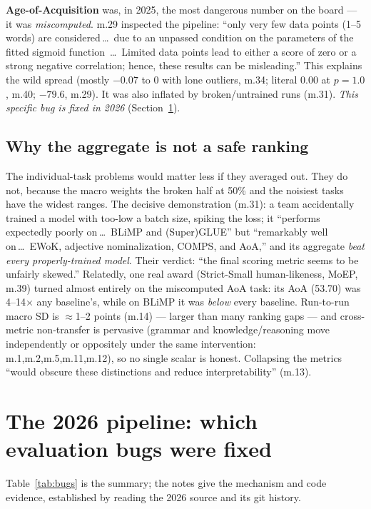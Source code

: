 \documentclass[11pt]{article}
\begin{document}
\textbf{Age-of-Acquisition} was, in 2025, the most dangerous number on the board --- it was
\emph{miscomputed}. m.29 inspected the pipeline: ``only very few data points (1--5 words) are
considered\,\dots\ due to an unpassed condition on the parameters of the fitted sigmoid function
\,\dots\ Limited data points lead to either a score of zero or a strong negative correlation; hence,
these results can be misleading.'' This explains the wild spread (mostly $-0.07$ to $0$ with lone
outliers, m.34; literal $0.00$ at $p{=}1.0$, m.40; $-79.6$, m.29). It was also inflated by
broken/untrained runs (m.31). \emph{This specific bug is fixed in 2026} (Section~\ref{sec:bugs}).

\subsection{Why the aggregate is not a safe ranking}
The individual-task problems would matter less if they averaged out. They do not, because the
macro weights the broken half at 50\% and the noisiest tasks have the widest ranges. The decisive
demonstration (m.31): a team accidentally trained a model with too-low a batch size, spiking the
loss; it ``performs expectedly poorly on\,\dots\ BLiMP and (Super)GLUE'' but ``remarkably well
on\,\dots\ EWoK, adjective nominalization, COMPS, and AoA,'' and its aggregate \emph{beat every
properly-trained model}. Their verdict: ``the final scoring metric seems to be unfairly skewed.''
Relatedly, one real award (Strict-Small human-likeness, MoEP, m.39) turned almost entirely on the
miscomputed AoA task: its AoA (53.70) was 4--14$\times$ any baseline's, while on BLiMP it was
\emph{below} every baseline. Run-to-run macro SD is $\approx$1--2 points (m.14) --- larger than many
ranking gaps --- and cross-metric non-transfer is pervasive (grammar and knowledge/reasoning move
independently or oppositely under the same intervention: m.1,m.2,m.5,m.11,m.12), so no single scalar
is honest. Collapsing the metrics ``would obscure these distinctions and reduce interpretability''
(m.13).

\section{The 2026 pipeline: which evaluation bugs were fixed}
\label{sec:bugs}
Table~\ref{tab:bugs} is the summary; the notes give the mechanism and code evidence, established by
reading the 2026 source and its git history.
\end{document}
